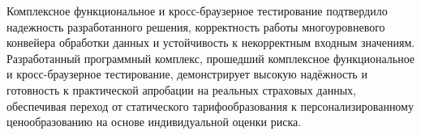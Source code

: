 Комплексное функциональное и кросс-браузерное тестирование подтвердило надежность разработанного решения, корректность работы многоуровневого конвейера обработки данных и устойчивость к некорректным входным значениям. Разработанный программный комплекс, прошедший комплексное функциональное и кросс-браузерное тестирование, демонстрирует высокую надёжность и готовность к практической апробации на реальных страховых данных, обеспечивая переход от статического тарифообразования к персонализированному ценообразованию на основе индивидуальной оценки риска.
